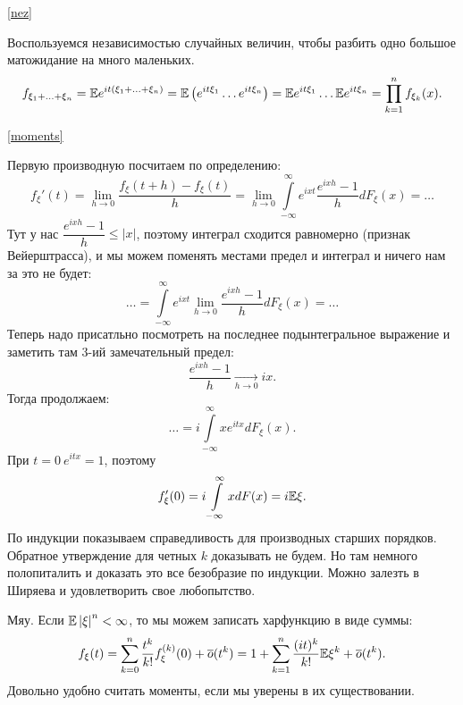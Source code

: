 \documentclass[../TV&MS.tex]{subfiles}
\begin{document}
\begin{Proof} \eqref{nez}

Воспользуемся независимостью случайных величин, чтобы разбить одно большое матожидание на много маленьких.
    $$
        f_{\xi_1 +  \ldots + \xi_n} =
        \mathbb{E} e^{it(\xi_1 + \ldots + \xi_n)} = 
        \mathbb{E} \left( e^{it\xi_1} \ldots e^{it\xi_n} \right) =
        \mathbb{E} e^{it\xi_1}  \ldots \mathbb{E} e^{it\xi_n} =
        \prod\limits_{k=1}^{n} f_{\xi_k}(x)
    .$$ 
\end{Proof} 

\begin{Proof} \eqref{moments}

    Первую производную посчитаем по определению:
    \[
        f_\xi'(t) = \lim\limits_{h \rightarrow 0} \frac{f_\xi(t + h) - f_\xi(t)}{h}=
        \lim\limits_{h \rightarrow 0} \int\limits_{-\infty}^{\infty} e^{ixt} \frac{e^{ixh} - 1}{h} dF_\xi(x) = \ldots 
    \]
    Тут у нас $\dfrac{e^{ixh} - 1}{h} \leqslant \left| x \right|$,
    поэтому интеграл сходится равномерно (признак Вейерштрасса),
    и мы можем поменять местами предел и интеграл и ничего нам за это не будет:
    \[
        \ldots = \int\limits_{-\infty}^{\infty} e^{ixt} 
        \lim\limits_{h \rightarrow 0} \frac{e^{ixh} - 1}{h} dF_\xi(x) = \ldots
    \] 
    Теперь надо присатльно посмотреть на последнее подынтегральное выражение и заметить там 3-ий замечательный предел:
    \[
        \frac{e^{ixh} - 1}{h} \xrightarrow[h \rightarrow 0]{} ix
    .\] 
    Тогда продолжаем:
    \[
        \ldots = i \int\limits_{-\infty}^{\infty} xe^{itx}dF_\xi(x)
    .\]
    При $t = 0 \  e^{itx} = 1$, поэтому
    \[
        f_\xi'(0) = i \int\limits_{-\infty}^{\infty} xdF(x) = i \mathbb{E} \xi
    .\]
    По индукции показываем справедливость для производных старших порядков.
    Обратное утверждение для четных $k$ доказывать не будем. Но там немного полопиталить и доказать это все безобразие по индукции. Можно залезть в Ширяева и удовлетворить свое любопытство.
\end{Proof}

\begin{Why}
    Мяу. Если $\mathbb{E} \left| \xi \right|^n < \infty$, то мы можем записать харфункцию в виде суммы:
    \[
        f_\xi(t) = \sum\limits_{k=0}^{n} \frac{t^k}{k!}f_\xi^{(k)}(0) +\overline{o}(t^{k}) =
        1 + \sum\limits_{k=1}^{n} \frac{(it)^k}{k!} \mathbb{E} \xi^k + \overline{o}(t^{k}) 
    .\]
    Довольно удобно считать моменты, если мы уверены в их существовании.
\end{Why} 
\end{document}
